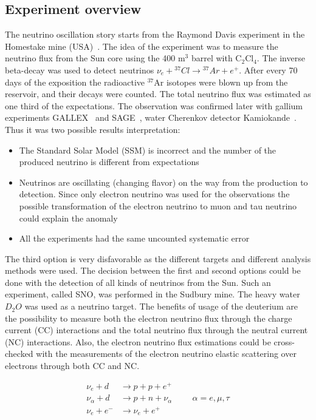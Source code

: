 \documentclass[../main.tex]{subfiles}
\begin{document}
\subsection{Experiment overview}
\label{sec:intro:osc_exp}
The neutrino oscillation story starts from the Raymond Davis experiment in the Homestake mine (USA)~\cite{Davis1968}. The idea of the experiment was to measure the neutrino flux from the Sun core using the 400 $\text{m}^3$ barrel with ${\text{C}_2\text{Cl}_4}$. The inverse beta-decay was used to detect neutrinos $\nu_e+{}^{37}Cl\to{}^{37}Ar+e^+$. After every 70 days of the exposition the radioactive ${}^{37}\text{Ar}$ isotopes were blown up from the reservoir, and their decays were counted. The total neutrino flux was estimated as one third of the expectations. The observation was confirmed later with gallium experiments GALLEX~\cite{Kirsten1999} and SAGE~\cite{Abdurashitov1999}, water Cherenkov detector Kamiokande~\cite{Oyama1989}. Thus it was two possible results interpretation:
\begin{itemize}
  \item The Standard Solar Model (SSM) is incorrect and the number of the produced neutrino is different from expectations
  \item Neutrinos are oscillating (changing flavor) on the way from the production to detection. Since only electron neutrino was used for the observations the possible transformation of the electron neutrino to muon and tau neutrino could explain the anomaly
  \item All the experiments had the same uncounted systematic error
\end{itemize}
The third option is very disfavorable as the different targets and different analysis methods were used. The decision between the first and second options could be done with the detection of all kinds of neutrinos from the Sun. Such an experiment, called SNO, was performed in the Sudbury mine. The heavy water $D_2O$ was used as a neutrino target. The benefits of usage of the deuterium are the possibility to measure both the electron neutrino flux through the charge current (CC) interactions and the total neutrino flux through the neutral current (NC) interactions. Also, the electron neutrino flux estimations could be cross-checked with the measurements of the electron neutrino elastic scattering over electrons through both CC and NC.

\begin{align}
\nu_e+d&\to p+p+e^+ \\
\nu_\alpha+d&\to p+n+\nu_\alpha\hspace{1cm} \alpha =e,\mu,\tau \\
\nu_e+e^-&\to\nu_e+e^+
\end{align}
\end{document}
